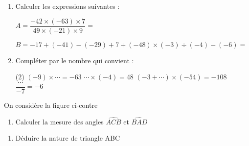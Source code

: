 \documentclass[a4paper,12pt]{article}
\begin{document}
\devoir[ds=true,num=3 ,niv=1 , date=10/01/2023,prv=true ]
\begin{exo}[12]
\begin{enumerate}
\item Calculer les expressions suivantes :

$A= \dfrac{-42\times (-63)\times 7}{49\times (-21)\times 9}=$\anserline[2]

$B=-17+(-41)-(-29)+7+(-48)\times (-3)\div (-4)-(-6)=$\anserline[3]
\item Compléter par le nombre qui convient :
\begin{tasks}[style=itemize](2)
\task $(-9)\times \cdots = -63$
\task $ \cdots \times (-4) = 48$
\task $(-3+ \cdots )\times (-54)= -108$
\task $\dfrac{\cdots}{-7}=-6$
\end{tasks} 
\end{enumerate}
\end{exo}

\begin{exo}[8]
\begin{minipage}{.65\linewidth}
On considère la figure ci-contre 
\begin{enumerate}
\item Calculer la mesure des angles $\widehat{ACB}$ et $\widehat{BAD}$ \newline\anserline[3]
\end{enumerate}
\end{minipage}
\begin{minipage}{.35\linewidth}
\end{minipage}
\begin{enumerate}[start=2]
\item Déduire la nature de triangle ABC
\anserline[4] 
\end{enumerate}
\end{exo}
\end{document}
